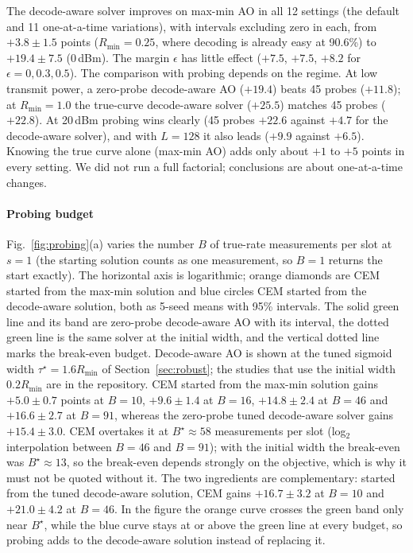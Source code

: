 \documentclass[journal]{IEEEtran}
\begin{document}
The decode-aware solver improves on max-min AO in all 12 settings (the default and 11 one-at-a-time variations), with intervals excluding zero in each, from $+3.8\pm1.5$ points ($R_{\text{min}}=0.25$, where decoding is already easy at 90.6\%) to $+19.4\pm7.5$ (0\,dBm). The margin $\epsilon$ has little effect ($+7.5$, $+7.5$, $+8.2$ for $\epsilon=0,0.3,0.5$). The comparison with probing depends on the regime. At low transmit power, a zero-probe decode-aware AO ($+19.4$) beats 45 probes ($+11.8$); at $R_{\text{min}}=1.0$ the true-curve decode-aware solver ($+25.5$) matches 45 probes ($+22.8$). At 20\,dBm probing wins clearly (45 probes $+22.6$ against $+4.7$ for the decode-aware solver), and with $L=128$ it also leads ($+9.9$ against $+6.5$). Knowing the true curve alone (max-min AO) adds only about $+1$ to $+5$ points in every setting. We did not run a full factorial; conclusions are about one-at-a-time changes.


\paragraph*{Probing budget} Fig.~\ref{fig:probing}(a) varies the number $B$ of true-rate measurements per slot at $s=1$ (the starting solution counts as one measurement, so $B=1$ returns the start exactly). The horizontal axis is logarithmic; orange diamonds are CEM started from the max-min solution and blue circles CEM started from the decode-aware solution, both as 5-seed means with 95\% intervals. The solid green line and its band are zero-probe decode-aware AO with its interval, the dotted green line is the same solver at the initial width, and the vertical dotted line marks the break-even budget. Decode-aware AO is shown at the tuned sigmoid width $\tau^\star=1.6R_{\min}$ of Section~\ref{sec:robust}; the studies that use the initial width $0.2R_{\min}$ are in the repository. CEM started from the max-min solution gains $+5.0\pm0.7$ points at $B=10$, $+9.6\pm1.4$ at $B=16$, $+14.8\pm2.4$ at $B=46$ and $+16.6\pm2.7$ at $B=91$, whereas the zero-probe tuned decode-aware solver gains $+15.4\pm3.0$. CEM overtakes it at $B^\star\approx58$ measurements per slot (log$_2$ interpolation between $B=46$ and $B=91$); with the initial width the break-even was $B^\star\approx13$, so the break-even depends strongly on the objective, which is why it must not be quoted without it. The two ingredients are complementary: started from the tuned decode-aware solution, CEM gains $+16.7\pm3.2$ at $B=10$ and $+21.0\pm4.2$ at $B=46$. In the figure the orange curve crosses the green band only near $B^\star$, while the blue curve stays at or above the green line at every budget, so probing adds to the decode-aware solution instead of replacing it.
\end{document}

